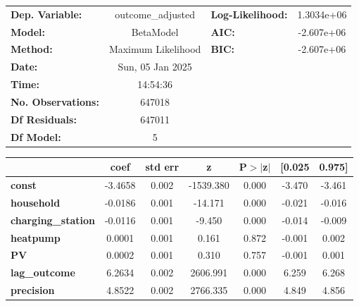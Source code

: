 \begin{center}
\begin{tabular}{lclc}
\toprule
\textbf{Dep. Variable:}    & outcome\_adjusted  & \textbf{  Log-Likelihood:    } & 1.3034e+06  \\
\textbf{Model:}            &     BetaModel      & \textbf{  AIC:               } & -2.607e+06  \\
\textbf{Method:}           & Maximum Likelihood & \textbf{  BIC:               } & -2.607e+06  \\
\textbf{Date:}             &  Sun, 05 Jan 2025  & \textbf{                     } &             \\
\textbf{Time:}             &      14:54:36      & \textbf{                     } &             \\
\textbf{No. Observations:} &       647018       & \textbf{                     } &             \\
\textbf{Df Residuals:}     &       647011       & \textbf{                     } &             \\
\textbf{Df Model:}         &            5       & \textbf{                     } &             \\
\bottomrule
\end{tabular}
\begin{tabular}{lcccccc}
                           & \textbf{coef} & \textbf{std err} & \textbf{z} & \textbf{P$> |$z$|$} & \textbf{[0.025} & \textbf{0.975]}  \\
\midrule
\textbf{const}             &      -3.4658  &        0.002     & -1539.380  &         0.000        &       -3.470    &       -3.461     \\
\textbf{household}         &      -0.0186  &        0.001     &   -14.171  &         0.000        &       -0.021    &       -0.016     \\
\textbf{charging\_station} &      -0.0116  &        0.001     &    -9.450  &         0.000        &       -0.014    &       -0.009     \\
\textbf{heatpump}          &       0.0001  &        0.001     &     0.161  &         0.872        &       -0.001    &        0.002     \\
\textbf{PV}                &       0.0002  &        0.001     &     0.310  &         0.757        &       -0.001    &        0.001     \\
\textbf{lag\_outcome}      &       6.2634  &        0.002     &  2606.991  &         0.000        &        6.259    &        6.268     \\
\textbf{precision}         &       4.8522  &        0.002     &  2766.335  &         0.000        &        4.849    &        4.856     \\
\bottomrule
\end{tabular}
\end{center}